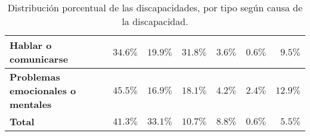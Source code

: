 \begin{table}[]
{\begin{tabular}{lllllll}
\multicolumn{1}{|m{3cm}|}{\textbf{Hablar o comunicarse}}
& \multicolumn{1}{r|}{$34.6\%$}
& \multicolumn{1}{r|}{$19.9\%$}
& \multicolumn{1}{r|}{$31.8\%$}
& \multicolumn{1}{r|}{$3.6\%$}
& \multicolumn{1}{r|}{$0.6\%$}
& \multicolumn{1}{r|}{$9.5\%$} \\ \hline

\multicolumn{1}{|m{3cm}|}{\textbf{Problemas emocionales o mentales}}
& \multicolumn{1}{r|}{$45.5\%$}
& \multicolumn{1}{r|}{$16.9\%$}
& \multicolumn{1}{r|}{$18.1\%$}
& \multicolumn{1}{r|}{$4.2\%$}
& \multicolumn{1}{r|}{$2.4\%$}
& \multicolumn{1}{r|}{$12.9\%$} \\ \hline

\multicolumn{1}{|m{3cm}|}{\textbf{Total}}
& \multicolumn{1}{r|}{$41.3\%$}
& \multicolumn{1}{r|}{$33.1\%$}
& \multicolumn{1}{r|}{$10.7\%$}
& \multicolumn{1}{r|}{$8.8\%$}
& \multicolumn{1}{r|}{$0.6\%$}
& \multicolumn{1}{r|}{$5.5\%$} \\ \hline
\end{tabular}
}
\caption{Distribuci\'on porcentual de las discapacidades, por tipo seg\'un
 causa de la discapacidad\cite{INEGI2014}.}
\label{discapacidadCausa}
\end{table}
